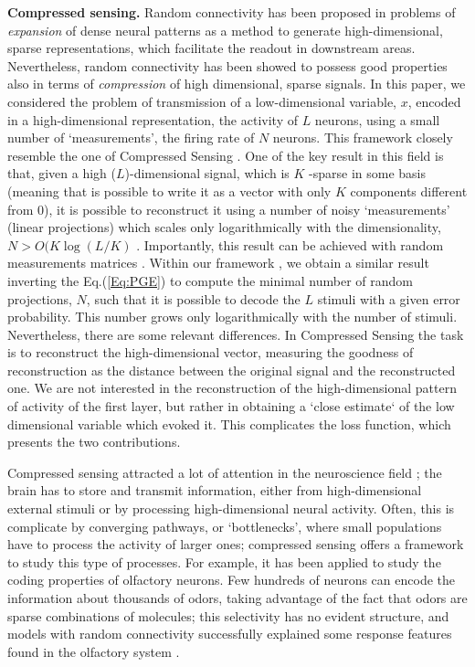 \documentclass[a4paper]{article}
\begin{document}
\textbf{Compressed sensing.} Random connectivity has been proposed in problems of \emph{expansion} of dense neural patterns \cite[]{Babadi2014SparsenessRepresentations,Barak2013FromDiscrimination,Lindsay2017HebbianCortex,Maoz2020LearningCircuits,Litwin-Kumar2017OptimalConnectivity} as a method to generate high-dimensional, sparse representations, which facilitate the readout in downstream areas. Nevertheless, random connectivity has been showed to possess good properties also in terms of \emph{compression} of high dimensional, sparse signals. In this paper,  we considered the problem of transmission of a low-dimensional variable, $x$, encoded in a high-dimensional representation, the activity of $L$ neurons, using a small number of `measurements', the firing rate of $N$ neurons. This framework closely resemble the one of Compressed Sensing \cite{Donoho2006CompressedSensing}. One of the key result in this field is that, given a high ($L$)-dimensional signal, which is $K$ -sparse in some basis (meaning that is possible to write it as a vector with only $K$ components different from $0$), it is possible to reconstruct it using a number of noisy `measurements' (linear projections) which scales only logarithmically with the dimensionality, $N > O(K \log{(L/K)}$ . Importantly, this result can be achieved with random measurements matrices \cite{Candes2006Near-optimalStrategies}. 
Within our framework , we obtain a similar result inverting the Eq.(\ref{Eq:PGE}) to compute the minimal number of random projections, $N$, such that it is possible to decode  the $L$ stimuli with a given error probability. This number grows only logarithmically with the number of stimuli. Nevertheless, there are some relevant differences. In Compressed Sensing the task is to reconstruct the high-dimensional vector, measuring the goodness of reconstruction as the distance between the original signal and the reconstructed one. We are not interested in the reconstruction of the high-dimensional pattern of activity of the first layer, but rather in obtaining a `close estimate` of the low dimensional variable which evoked it. This complicates the loss function, which presents the two  contributions.

Compressed sensing attracted a lot of attention in the neuroscience field \cite{Ganguli2012CompressedAnalysis}; the brain has to store and  transmit information, either from high-dimensional external stimuli or by processing high-dimensional neural activity. Often, this is complicate by converging pathways, or `bottlenecks', where small populations have to process the activity of larger ones; compressed sensing offers a framework to study this type of processes. For example, it has been applied to study the coding properties of olfactory neurons. Few hundreds of neurons can encode the information about thousands of odors, taking advantage of the fact that odors are sparse combinations of molecules; this selectivity has no evident structure, and models with random connectivity successfully  explained some response features found in the olfactory system \cite[]{Stettler2009RepresentationsCortex,Zhang2016ASystem,Qin2019OptimalActivity}. 
\end{document}
